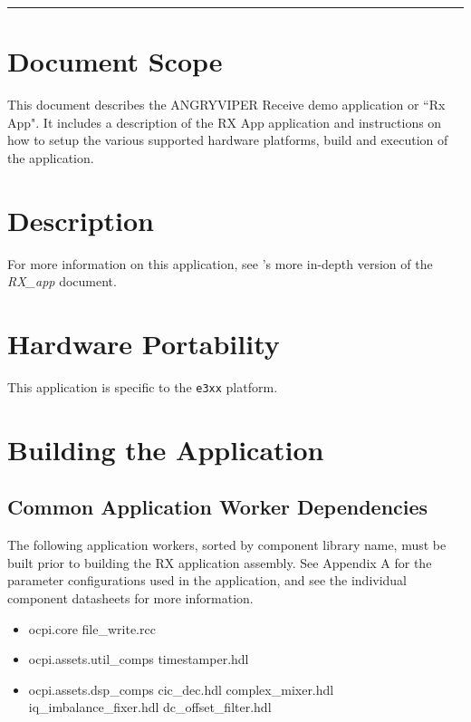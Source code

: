 \newpage
\tableofcontents
\pagebreak
\vspace{1pc}
\hrule
\def\assetsdoc{\noindent For more information on this application, see \code{ocpi.assets}'s more in-depth version of the \textit{RX\_app} document.}
\section{Document Scope}
This document describes the ANGRYVIPER Receive demo application or ``Rx App". It includes a description of the RX App application and instructions on how to setup the various supported hardware platforms, build and execution of the application.

\section{Description}
\assetsdoc

\section{Hardware Portability}
This application is specific to the \verb+e3xx+ platform.

\section{Building the Application}
\subsection{Common Application Worker Dependencies}
The following application workers, sorted by component library name, must be built prior to building the RX application assembly. See Appendix A for the parameter configurations used in the application, and see the individual component datasheets for more information.\par\bigskip
	\begin{minipage}[t]{.5\textwidth}
	\begin{itemize}
		\item ocpi.core
			\subitem file\_write.rcc
		\item ocpi.assets.util\_comps
			\subitem timestamper.hdl
		\item ocpi.assets.dsp\_comps
			\subitem cic\_dec.hdl
			\subitem complex\_mixer.hdl
			\subitem iq\_imbalance\_fixer.hdl
			\subitem dc\_offset\_filter.hdl
	\end{itemize}
	\end{minipage}

